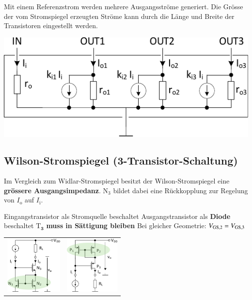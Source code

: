 \begin{minipage}[t]{0.48\columnwidth}
    Mit einem Referenzstrom werden mehrere Ausgangsströme generiert. 
    Die Grösse der vom Stromspiegel erzeugten Ströme kann durch die Länge und Breite der Transistoren eingestellt werden.
\end{minipage}
\hfill
\begin{minipage}[t]{0.48\columnwidth}
    \includegraphics[width=\columnwidth, align=t]{images/06_mehrfachstromspiegel.pdf}
\end{minipage}



\subsection{Wilson-Stromspiegel (3-Transistor-Schaltung)}
Im Vergleich zum Widlar-Stromspiegel besitzt der Wilson-Stromspiegel eine \textbf{grössere Ausgangsimpedanz}.
$\text{N}_3$ bildet dabei eine Rückkopplung zur Regelung von $I_\text{o}$ auf $I_\text{i}$.

\begin{minipage}[c]{0.35\columnwidth}
    \raggedright
    \begin{outline}
        \1 Eingangstransistor als Stromquelle beschaltet
        \1 Ausgangstransistor als \textbf{Diode} beschaltet
        \1 $\bm{\mathrm{T}_3}$ \textbf{muss in Sättigung bleiben}
        \1 Bei gleicher Geometrie: $V_{\rm GS,2} = V_{\rm GS,3}$
    \end{outline}
\end{minipage}
\hfill
\begin{minipage}[c]{0.64\columnwidth}
     \begin{tabular}{c c@{}}
        \includegraphics[height=2.9cm, align=t]{images/06_stormspiegel_wilson_nKanal.pdf} & 
        \includegraphics[height=2.9cm, align=t]{images/06_stormspiegel_wilson_pKanal.pdf}
    \end{tabular}
    
\end{minipage}


